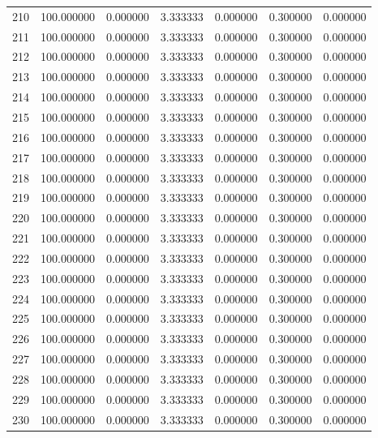 \begin{tabular}{rrrrrrr}
210 & 100.000000 &    0.000000 &  3.333333 &    0.000000 &    0.300000 &  0.000000 \\
211 & 100.000000 &    0.000000 &  3.333333 &    0.000000 &    0.300000 &  0.000000 \\
212 & 100.000000 &    0.000000 &  3.333333 &    0.000000 &    0.300000 &  0.000000 \\
213 & 100.000000 &    0.000000 &  3.333333 &    0.000000 &    0.300000 &  0.000000 \\
214 & 100.000000 &    0.000000 &  3.333333 &    0.000000 &    0.300000 &  0.000000 \\
215 & 100.000000 &    0.000000 &  3.333333 &    0.000000 &    0.300000 &  0.000000 \\
216 & 100.000000 &    0.000000 &  3.333333 &    0.000000 &    0.300000 &  0.000000 \\
217 & 100.000000 &    0.000000 &  3.333333 &    0.000000 &    0.300000 &  0.000000 \\
218 & 100.000000 &    0.000000 &  3.333333 &    0.000000 &    0.300000 &  0.000000 \\
219 & 100.000000 &    0.000000 &  3.333333 &    0.000000 &    0.300000 &  0.000000 \\
220 & 100.000000 &    0.000000 &  3.333333 &    0.000000 &    0.300000 &  0.000000 \\
221 & 100.000000 &    0.000000 &  3.333333 &    0.000000 &    0.300000 &  0.000000 \\
222 & 100.000000 &    0.000000 &  3.333333 &    0.000000 &    0.300000 &  0.000000 \\
223 & 100.000000 &    0.000000 &  3.333333 &    0.000000 &    0.300000 &  0.000000 \\
224 & 100.000000 &    0.000000 &  3.333333 &    0.000000 &    0.300000 &  0.000000 \\
225 & 100.000000 &    0.000000 &  3.333333 &    0.000000 &    0.300000 &  0.000000 \\
226 & 100.000000 &    0.000000 &  3.333333 &    0.000000 &    0.300000 &  0.000000 \\
227 & 100.000000 &    0.000000 &  3.333333 &    0.000000 &    0.300000 &  0.000000 \\
228 & 100.000000 &    0.000000 &  3.333333 &    0.000000 &    0.300000 &  0.000000 \\
229 & 100.000000 &    0.000000 &  3.333333 &    0.000000 &    0.300000 &  0.000000 \\
230 & 100.000000 &    0.000000 &  3.333333 &    0.000000 &    0.300000 &  0.000000 \\

\end{tabular}
